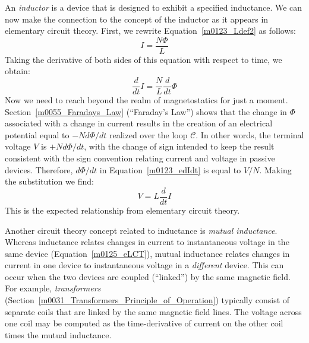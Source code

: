 An \emph{inductor} 
is a device that is designed to exhibit a specified inductance.
We can now make the connection to the concept of the inductor as it appears in elementary circuit theory.
First, we rewrite Equation~\ref{m0123_Ldef2} as follows:
%
\begin{equation}
I = \frac{N\Phi}{L}
\end{equation} 
%
Taking the derivative of both sides of this equation with respect to time, we obtain:
%
\begin{equation}
\frac{d}{dt}I = \frac{N}{L}\frac{d}{dt}\Phi
\label{m0123_edIdt}
\end{equation} 
%
Now we need to reach beyond the realm of magnetostatics for just a moment. 
Section~\ref{m0055_Faradays_Law} (``Faraday's Law'') shows that the change in $\Phi$ associated with a change in current %
results in the creation of an electrical potential equal to $-Nd\Phi/dt$ realized over the loop ${\mathcal C}$.  
In other words, the terminal voltage $V$ is $+Nd\Phi/dt$, with the change of sign intended to keep the result consistent with the sign convention relating current and voltage in passive devices.
Therefore, $d\Phi/dt$ in Equation~\ref{m0123_edIdt} is equal to $V/N$.
Making the substitution we find:
%
\begin{equation}
V = L\frac{d}{dt}I
\label{m0125_eLCT} 
\end{equation}
%
This is the expected relationship from elementary circuit theory.

Another circuit theory concept related to inductance is \emph{mutual inductance}.  
Whereas inductance relates changes in current to instantaneous voltage in the same device (Equation~\ref{m0125_eLCT}), mutual inductance relates changes in current in one device to instantaneous voltage in a \emph{different} device.  This can occur when the two devices are coupled (``linked'') by the same magnetic field.  For example, \emph{transformers}
(Section~\ref{m0031_Transformers_Principle_of_Operation}) typically consist of separate coils that are linked by the same magnetic field lines.  The voltage across one coil may be computed as the time-derivative of current on the other coil times the mutual inductance.   

